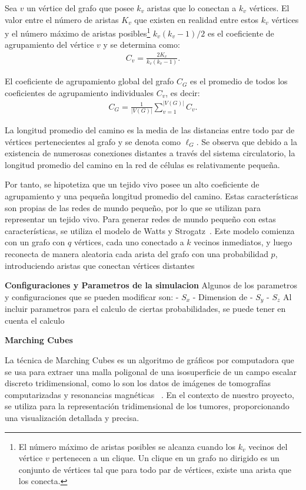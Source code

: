 \documentclass[a4paper,11pt]{article}
\begin{document}
{Sea $v$ un v\'ertice del grafo que posee $k_v$ aristas que lo conectan a $k_v$ v\'ertices. El valor entre el n\'umero de aristas $K_v$ que existen en realidad entre estos $k_v$ v\'ertices y el n\'umero m\'aximo de aristas posibles\footnote{El n\'umero m\'aximo de aristas posibles se alcanza cuando los $k_v$ vecinos del v\'ertice $v$ pertenecen a un clique. Un clique en un grafo no dirigido es un conjunto de v\'ertices tal que para todo par de v\'ertices, existe una arista que los conecta.} $k_v(k_v-1)/2$ es el coeficiente de agrupamiento del v\'ertice $v$ y se determina como:
\begin{align}
C_v = \displaystyle\frac{2K_v}{k_v(k_v-1)}. \label{eq-clustering}
\end{align}

El coeficiente de agrupamiento global del grafo $C_G$ es el promedio de todos los coeficientes de agrupamiento individuales $C_v$, es decir:
\begin{align}
C_G = \displaystyle\frac{1}{|V(G)|}\sum _{v=1} ^{|V(G)|} C_v. \label{eq-global-clustering}
\end{align}

La longitud promedio del camino es la media de las distancias entre todo par de v\'ertices pertenecientes al grafo y se denota como $\ell_G$. Se observa que debido a la existencia de numerosas conexiones distantes a través del sistema circulatorio, la longitud promedio del camino en la red de células es relativamente pequeña.

Por tanto, se hipotetiza que un tejido vivo posee un alto coeficiente de agrupamiento y una pequeña longitud promedio del camino. Estas características son propias de las redes de mundo pequeño, por lo que se utilizan para representar un tejido vivo. Para generar redes de mundo pequeño con estas características, se utiliza el modelo de Watts y Strogatz~\cite{31}. Este modelo comienza con un grafo con $q$ vértices, cada uno conectado a $k$ vecinos inmediatos, y luego reconecta de manera aleatoria cada arista del grafo con una probabilidad $p$, introduciendo aristas que conectan vértices distantes

\textbf{Configuraciones y Parametros de la simulacion}
Algunos de los parametros y configuraciones que se pueden modificar son: 
- $S_{x}$ - Dimension de
- $S_{y}$
- $S_{z}$
Al incluir parametros para el calculo de ciertas probabilidades, se puede tener en cuenta el calculo

\textbf{Marching Cubes}

La técnica de Marching Cubes es un algoritmo de gráficos por computadora que se usa para extraer una malla poligonal de una isosuperficie de un campo escalar discreto tridimensional, como lo son los datos de imágenes de tomografías computarizadas y resonancias magnéticas ~\cite{7}. En el contexto de nuestro proyecto, se utiliza para la representación tridimensional de los tumores, proporcionando una visualización detallada y precisa.

}
\end{document}

